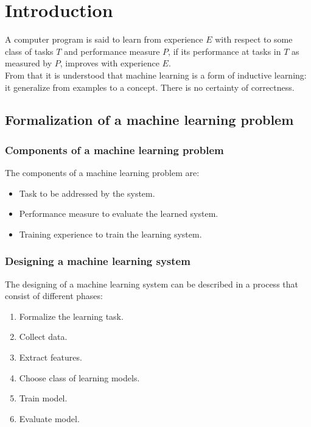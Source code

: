 \chapter{Introduction}
A computer program is said to learn from experience $E$ with respect to some class of tasks $T$ and performance measure $P$, if its performance at tasks in $T$ as measured by $P$, improves with experience $E$.\\
From that it is understood that machine learning is a form of inductive learning: it generalize from examples to a concept.
There is no certainty of correctness.

\section{Formalization of a machine learning problem}

	\subsection{Components of a machine learning problem}
	The components of a machine learning problem are:

	\begin{multicols}{2}
		\begin{itemize}
			\item Task to be addressed by the system.
			\item Performance measure to evaluate the learned system.
			\item Training experience to train the learning system.
		\end{itemize}
	\end{multicols}

	\subsection{Designing a machine learning system}
	The designing of a machine learning system can be described in a process that consist of different phases:

	\begin{multicols}{2}
		\begin{enumerate}
			\item Formalize the learning task.
			\item Collect data.
			\item Extract features.
			\item Choose class of learning models.
			\item Train model.
			\item Evaluate model.
		\end{enumerate}
	\end{multicols}

